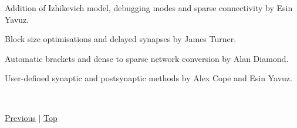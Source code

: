 Addition of Izhikevich model, debugging modes and sparse connectivity by Esin Yavuz.

Block size optimisations and delayed synapses by James Turner.

Automatic brackets and dense to sparse network conversion by Alan Diamond.

User-\/defined synaptic and postsynaptic methods by Alex Cope and Esin Yavuz.

~\newline
 

 \hyperlink{ListOfVariables}{Previous} $\vert$ \hyperlink{Credits}{Top} 